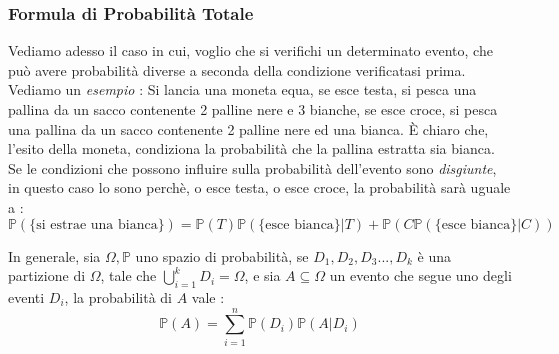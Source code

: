 \documentclass[12pt, letterpaper]{article}
\begin{document}
\subsubsection{Formula di Probabilità Totale}
Vediamo adesso il caso in cui, voglio che si verifichi un determinato evento, che può avere probabilità 
diverse a seconda della condizione verificatasi prima.\\ Vediamo un \textit{esempio} : Si lancia una moneta equa, 
se esce testa, si pesca una pallina da un sacco contenente 2 palline nere e 3 bianche, 
se esce croce, si pesca una pallina da un sacco contenente 2 palline nere ed una bianca. È chiaro che, l'esito 
della moneta, condiziona la probabilità che la pallina estratta sia bianca. Se le condizioni che possono 
influire sulla probabilità dell'evento sono \textit{disgiunte}, in questo caso lo sono perchè, o esce testa, 
o esce croce, la probabilità sarà uguale a :
\begin{equation}
    \mathbb{P}(\text{\{si estrae una bianca\}}) = \mathbb{P}(T)\mathbb{P}(\text{\{esce bianca\}}|T)+\mathbb{P}(C\mathbb{P}(\text{\{esce bianca\}}|C))
\end{equation}

    In generale, sia \(\Omega, \mathbb{P}\) uno spazio di probabilità, se \(D_1,D_2,D_3...,D_k\) è una partizione 
    di \(\Omega\), tale che \(\displaystyle\bigcup_{i=1}^kD_i=\Omega\), e sia \(A\subseteq \Omega\) un evento che 
    segue uno degli eventi \(D_i\), la probabilità di \(A\) vale : \begin{equation}
        \mathbb{P}(A)=\sum_{i=1}^n\mathbb{P}(D_i)\mathbb{P}(A|D_i)
    \end{equation}

\begin{figure}[h]
\end{figure}
\end{document}
